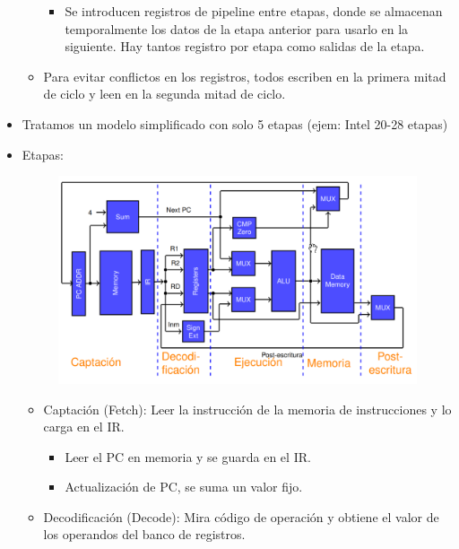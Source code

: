 \documentclass[12pt, twoside, openright]{report} %
\begin{document}
\begin{itemize}
\begin{itemize}
\begin{itemize}
      \item
        Se introducen registros de pipeline entre etapas, donde se
        almacenan temporalmente los datos de la etapa anterior para
        usarlo en la siguiente. Hay tantos registro por etapa como
        salidas de la etapa.
      \end{itemize}
    \item
      Para evitar conflictos en los registros, todos escriben en la
      primera mitad de ciclo y leen en la segunda mitad de ciclo.
    \end{itemize}
  \item
    Tratamos un modelo simplificado con solo 5 etapas (ejem: Intel 20-28
    etapas)
    \pagebreak
    \item
    Etapas:
    \begin{figure}[H]
      {\includegraphics[scale=.3]{Untitled 8.png}}
    \end{figure}
    \begin{itemize}
    
    \item
      Captación (Fetch): Leer la instrucción de la memoria de
      instrucciones y lo carga en el IR.

      \begin{itemize}
      
      \item
        Leer el PC en memoria y se guarda en el IR.
      \item
        Actualización de PC, se suma un valor fijo.
      \end{itemize}
    \item
      Decodificación (Decode): Mira código de operación y obtiene el
      valor de los operandos del banco de registros.


\end{itemize}
\end{itemize}
\end{document}
